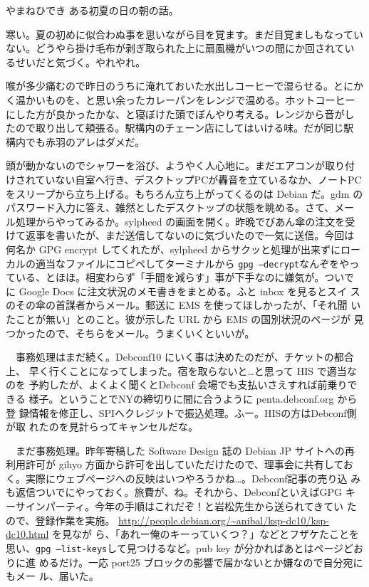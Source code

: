 \begin{prework}{ やまねひでき }
 ある初夏の日の朝の話。

 寒い。夏の初めに似合わぬ事を思いながら目を覚ます。まだ目覚ましもなってい
 ない。どうやら掛け毛布が剥ぎ取られた上に扇風機がいつの間にか回されてい
 るせいだと気づく。やれやれ。

 喉が多少痛むので昨日のうちに淹れておいた水出しコーヒーで湿らせる。とにか
 く温かいものを、と思い余ったカレーパンをレンジで温める。ホットコーヒー
 にした方が良かったかな、と寝ぼけた頭でぼんやり考える。レンジから音がし
 たので取り出して頬張る。駅構内のチェーン店にしてはいける味。だが同じ駅
 構内でも赤羽のアレはダメだ。

 頭が動かないのでシャワーを浴び、ようやく人心地に。まだエアコンが取り付
 けされていない自室へ行き、デスクトップPCが轟音を立ているなか、ノートPC
 をスリープから立ち上げる。もちろん立ち上がってくるのは Debian だ。gdm
 のパスワード入力に答え、雑然としたデスクトップの状態を眺める。さて、メー
 ル処理からやってみるか。sylpheed の画面を開く。昨晩でびあん傘の注文を受
 けて返事を書いたが、まだ送信してないのに気づいたので一気に送信。今回は
 何名か GPG encrypt してくれたが、sylpheed からサクッと処理が出来ずにロー
 カルの適当なファイルにコピペしてターミナルから \texttt{gpg --decrypt}なんぞをやっ
 ている、とほほ。相変わらず「手間を減らす」事が下手なのに嫌気が。ついで
 に Google Docs に注文状況のメモ書きをまとめる。ふと inbox を見るとスイ
 スのその傘の首謀者からメール。郵送に EMS を使ってほしかったが、「それ聞
 いたことが無い」とのこと。彼が示した URL から EMS の国別状況のページが
 見つかったので、そちらをメール。うまくいくといいが。

　事務処理はまだ続く。Debconf10 にいく事は決めたのだが、チケットの都合上、
 早く行くことになってしまった。宿を取らないと…と思って HIS で適当なのを
 予約したが、よくよく聞くとDebconf 会場でも支払いさえすれば前乗りできる
 様子。ということでNYの締切りに間に合うように penta.debconf.org から登
 録情報を修正し、SPIへクレジットで振込処理。ふー。HISの方はDebconf側が取
 れたのを見計らってキャンセルだな。

　まだ事務処理。昨年寄稿した Software Design 誌の Debian JP サイトへの再
 利用許可が gihyo 方面から許可を出していただけたので、理事会に共有してお
 く。実際にウェブページへの反映はいつやろうかね…。Debconf記事の売り込
 みも返信ついでにやっておく。旅費が、ね。それから、DebconfといえばGPG
 キーサインパーティ。今年の手順はこれだぞ！と岩松先生から送られてきてい
 たので、登録作業を実施。
 \url{http://people.debian.org/~anibal/ksp-dc10/ksp-dc10.html} を見なが
 ら、「あれー俺のキーっていくつ？」などとフザケたことを思い、\texttt{gpg
 --list-keys}して見つけるなど。pub key が分かればあとはページどおりに進
 めるだけ。一応 port25 ブロックの影響で届かないとか嫌なので自分宛にもメー
 ル、届いた。



\end{prework}
